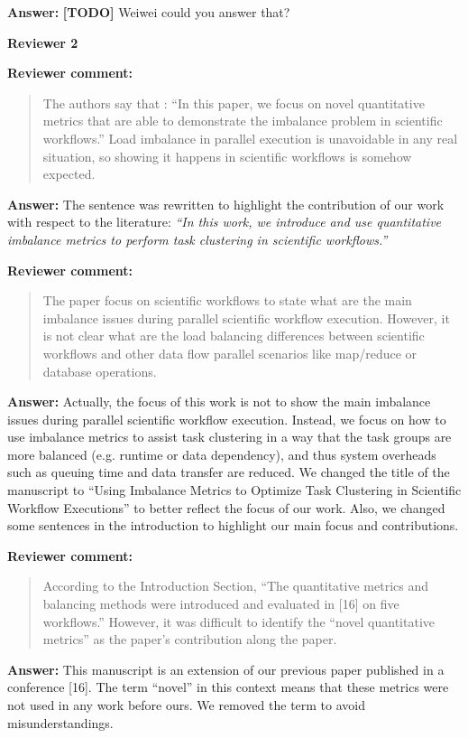 \documentclass{letter}
\newenvironment{review}%
{\textbf{Reviewer comment:}\begin{quote}}%
{\end{quote}}%
\newcommand{\todo}[1]{%
      \color{red}\textbf{[TODO]} #1\color{black}}
\newcommand{\answer}[1]{%
      \textbf{Answer:} #1}
\newcommand{\revised}[1]{\emph{#1}\color{black}}
\begin{document}
\begin{letter}{}
\answer{\todo{Weiwei could you answer that?}}


\newpage

\textbf{Reviewer 2}


\begin{review}
The authors say that : ``In this paper, we focus on novel quantitative metrics that are able to demonstrate the imbalance problem in scientific workflows.'' Load imbalance in parallel execution is unavoidable in any real situation, so showing it happens in scientific workflows is somehow expected.

\end{review}

\answer{The sentence was rewritten to highlight the contribution of our work with respect to the literature:
\revised{``In this work, we introduce and use quantitative imbalance metrics to perform task clustering in scientific workflows.''}}


\begin{review}
The paper focus on scientific workflows to state what are the main imbalance issues during parallel scientific workflow execution. However, it is not clear what are the load balancing differences between scientific workflows and other data flow parallel scenarios like map/reduce or database operations.
\end{review}

\answer{Actually, the focus of this work is not to show the main imbalance issues during parallel scientific workflow execution. Instead, we focus on how to use imbalance metrics to assist task clustering in a way that the task groups are more balanced (e.g. runtime or data dependency), and thus system overheads such as queuing time and data transfer are reduced. We changed the title of the manuscript to ``Using Imbalance Metrics to Optimize Task Clustering in Scientific Workflow Executions'' to better reflect the focus of our work. Also, we changed some sentences in the introduction to highlight our main focus and contributions.}


\begin{review}
According to the Introduction Section, ``The quantitative metrics and balancing methods were introduced and evaluated in [16] on five workflows.'' However, it was difficult to identify the ``novel quantitative metrics'' as the paper's contribution along the paper. 
\end{review}

\answer{This manuscript is an extension of our previous paper published in a conference [16]. The term ``novel'' in this context means that these metrics were not used in any work before ours. We removed the term to avoid misunderstandings.}



\end{letter}
\end{document}
